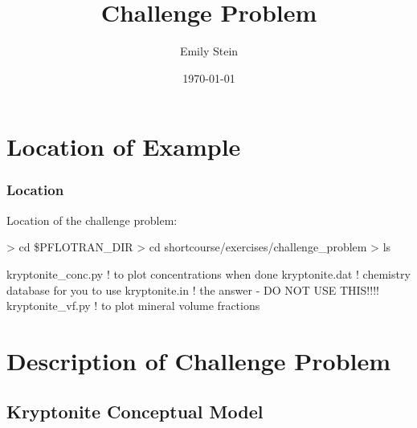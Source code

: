 \documentclass{beamer}
\newcommand\bluecomment[1]{{{\color{blue} #1}}}
\begin{document}
\title{Challenge Problem}
\author{Emily Stein}
\date{\today}


%

\section{Location of Example}

\begin{frame}\frametitle{Location}

Location of the challenge problem:

\begin{semiverbatim}
> cd \$PFLOTRAN_DIR
> cd shortcourse/exercises/challenge_problem
> ls

kryptonite_conc.py \bluecomment{! to plot concentrations when done}
kryptonite.dat     \bluecomment{! chemistry database for you to use}
kryptonite.in      \bluecomment{! the answer - DO NOT USE THIS!!!!}
kryptonite_vf.py   \bluecomment{! to plot mineral volume fractions}
\end{semiverbatim}

\end{frame}

\section{Description of Challenge Problem}

\subsection{Kryptonite Conceptual Model}
\end{document}
